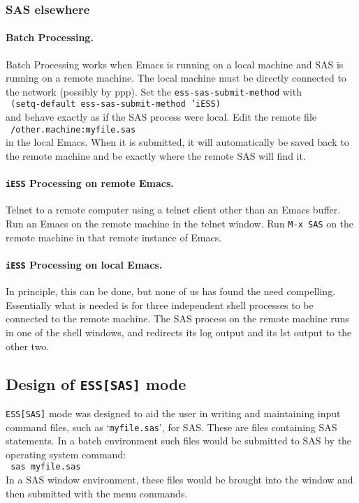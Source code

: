 \documentclass{article}
\newcommand{\stexttt}[1]{{\small\texttt{#1}}}
\newcommand{\ssf}[1]{{\small\sf{#1}}}
\newcommand{\elcode}[1]{\\{\stexttt{\hspace*{2em} #1}}\\}
\newcommand{\file}[1]{`\stexttt{#1}'}
\begin{document}
\subsubsection{SAS elsewhere}

\paragraph{Batch Processing.}
Batch Processing works when Emacs is running on a local machine and SAS
is running on a remote machine.  The local machine must be directly
connected to the network (possibly by ppp).
Set the \stexttt{ess-sas-submit-method} with
\elcode{(setq-default ess-sas-submit-method 'iESS)}
and behave exactly as if the SAS process were local.
Edit the remote file \elcode{/other.machine:myfile.sas} in the local Emacs.
When it is submitted, it will automatically be saved back to the remote
machine and be exactly where the remote SAS will find it.

\paragraph{\stexttt{iESS} Processing on remote Emacs.}
Telnet to a remote computer using a telnet client other than an Emacs buffer.
Run an Emacs on the remote machine in the telnet window.
Run \stexttt{M-x SAS} on the remote machine in that remote instance of Emacs.

\paragraph{\stexttt{iESS} Processing on local Emacs.}
In principle, this can be done, but none of us has found the need
compelling.  Essentially what is needed is for three independent shell
processes to be connected to the remote machine.  The SAS process on
the remote machine runs in one of the shell windows, and redirects its
log output and its lst output to the other two.


\subsection{Design of \texttt{ESS[SAS]} mode}
\label{sec:SAS:phil}

\stexttt{ESS[SAS]} mode was designed to aid the user in writing and maintaining
input command files, such as \file{myfile.sas}, for SAS.  These are files
containing SAS statements.  In a batch environment such files would be
submitted to SAS by the operating system command:
\elcode{sas myfile.sas}
In a SAS window environment, these files would be brought into the
\ssf{SAS: PROGRAM EDITOR} window and then submitted with the
\ssf{Local/Submit}
menu commands.
\end{document}
